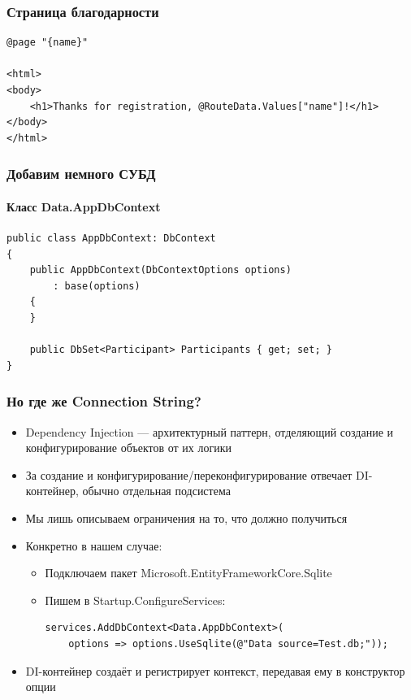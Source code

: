 \documentclass[xetex,mathserif,serif]{beamer}
\begin{document}
	\begin{frame}[fragile]
		\frametitle{Страница благодарности}
		\begin{small}
			\begin{verbatim}
@page "{name}"

<html>
<body>
    <h1>Thanks for registration, @RouteData.Values["name"]!</h1>
</body>
</html>
			\end{verbatim}
		\end{small}
	\end{frame}

	\begin{frame}[fragile]
		\frametitle{Добавим немного СУБД}
		\framesubtitle{Класс Data.AppDbContext}
		\begin{small}
			\begin{verbatim}
public class AppDbContext: DbContext
{
    public AppDbContext(DbContextOptions options)
        : base(options)
    {
    }

    public DbSet<Participant> Participants { get; set; }
}
			\end{verbatim}
		\end{small}
	\end{frame}

	\begin{frame}[fragile]
		\frametitle{Но где же Connection String?}
		\begin{itemize}
			\item Dependency Injection --- архитектурный паттерн, отделяющий создание и конфигурирование объектов от их логики
			\item За создание и конфигурирование/переконфигурирование отвечает DI-контейнер, обычно отдельная подсистема
			\item Мы лишь описываем ограничения на то, что должно получиться
			\item Конкретно в нашем случае:
			\begin{itemize} 
				\item Подключаем пакет Microsoft.EntityFrameworkCore.Sqlite
				\item Пишем в Startup.ConfigureServices:
				\begin{verbatim}
services.AddDbContext<Data.AppDbContext>(
    options => options.UseSqlite(@"Data source=Test.db;"));
				\end{verbatim}
			\end{itemize}
			\item DI-контейнер создаёт и регистрирует контекст, передавая ему в конструктор опции
		\end{itemize}
	\end{frame}
\end{document}
